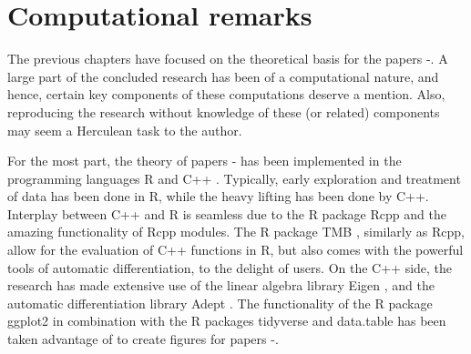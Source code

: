 \chapter{Computational remarks}
\label{chap:computation}

The previous chapters have focused on the theoretical basis for the papers -.
A large part of the concluded research has been of a computational nature, and hence, certain key components of these computations deserve a mention.
Also, reproducing the research without knowledge of these (or related) components may seem a Herculean task to the author.

For the most part, the theory of papers - has been implemented in the programming 
languages R \citep{Rlanguage2018} and C++ \citep{stroustrup2000cpp}.
Typically, early exploration and treatment of data has been done in R, while the heavy lifting has been
done by C++.
Interplay between C++ and R is seamless due to the R package Rcpp \citep{rcpp2011R} and the amazing functionality of Rcpp modules.
The R package TMB \citep{kristensen2016tmb}, similarly as Rcpp, allow for the evaluation of C++ functions in R, but also comes with the powerful tools of automatic differentiation, to the delight of users.
On the C++ side, the research has made extensive use of the linear algebra library Eigen \citep{eigenweb},
and the automatic differentiation library Adept \citep{hogan2014fast}.
The functionality of the R package ggplot2 \citep{wickham2016ggplot} in combination with the
R packages tidyverse \citep{wickham2017tidyverse} and data.table \citep{dowle2019datatable}
has been taken advantage of to create figures for papers -.

